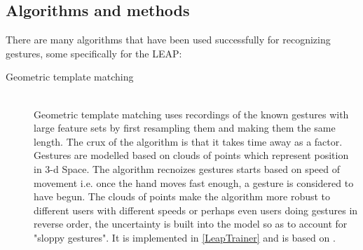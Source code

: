 \documentclass[a4paper]{article}
\begin{document}
\subsection{Algorithms and methods}
There are many algorithms that have been used successfully for recognizing gestures, some specifically for the LEAP:
\begin{description}
\item[Geometric template matching]{\label{GMT}\hfill \\
Geometric template matching uses recordings of the known gestures with large feature sets by first resampling them and making them the same length. The crux of the algorithm is that it takes time away as a factor. Gestures are modelled based on clouds of points which represent position in 3-d Space. The algorithm recnoizes gestures starts based on speed of movement i.e. once the hand moves fast enough, a gesture is considered to have begun. The clouds of points make the algorithm more robust to different users with different speeds or perhaps even users doing gestures in reverse order, the uncertainty is built into the model so as to account for "sloppy gestures". It is implemented in \ref{LeapTrainer} and is based on \cite{P}.

}
\end{description}
\end{document}
